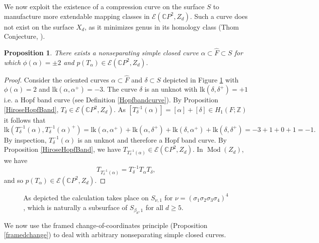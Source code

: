 \documentclass[10pt]{amsart}
\numberwithin{equation}{section}
\theoremstyle{plain}
\newtheorem{proposition}[theorem]{Proposition}
\theoremstyle{definition}
\theoremstyle{remark}
\DeclareMathOperator{\Mod}{Mod}
\begin{document}
We now exploit the existence of a compression curve on the surface $S$ to manufacture more extendable mapping classes in $\mathcal{E}(\mathbb{C}P^2,Z_d)$. Such a curve does not exist on the surface $X_d$,  as it minimizes genus in its homology class (Thom Conjecture, \cite{KronMrowka}). 



\begin{proposition} \label{existcurves}
There exists a nonseparating simple closed curve $\alpha \subset \widehat{F} \subset S$ for which $\phi(\alpha) = \pm2$ and $p(T_{\alpha})\in\mathcal{E}(\mathbb{C}P^2,Z_d)$. 
\end{proposition}

\begin{proof}
Consider the oriented curves $\alpha \subset \widehat{F}$ and $\delta \subset S$ depicted in Figure \ref{existenceofcurves} with $\phi(\alpha) = 2$ and $\mathrm{lk}(\alpha,\alpha^+) = -3$. The curve $\delta$ is an unknot with $\textrm{lk}(\delta,\delta^+) = +1$ i.e. a Hopf band curve (see Definition \ref{Hopfbandcurve}). By Proposition \ref{HiroseHopfBand}, $T_{\delta} \in \mathcal{E}(\mathbb{C}P^2,Z_d)$. %
As $[T_{\delta}^{-1}(\alpha)] = [\alpha] + [\delta] \in H_1(F;\mathbb{Z})$ it follows that \[\textrm{lk}(T_{\delta}^{-1}(\alpha),T_{\delta}^{-1}(\alpha)^+) = \mathrm{lk}(\alpha,\alpha^+) + \mathrm{lk}(\alpha,\delta^+) + \mathrm{lk}(\delta,\alpha^+) + \mathrm{lk}(\delta,\delta^+) = -3 + 1 + 0 + 1 =  -1.\] By inspection, $T_{\delta}^{-1}(\alpha)$ is an unknot and therefore a Hopf band curve. By Proposition \ref{HiroseHopfBand}, we have $T_{T_{\delta}^{-1}(\alpha)} \in \mathcal{E}(\mathbb{C}P^2,Z_d)$. In $\Mod(Z_d)$, we have \[T_{T_{\delta}^{-1}(\alpha)} = T_{\delta}^{-1}T_{\alpha}T_{\delta}, \] and so $p(T_{\alpha}) \in \mathcal{E}(\mathbb{C}P^2,Z_d)$. 
\end{proof}



\begin{figure}
  \centering
  \def\svgwidth{0.9\columnwidth}
  
  \caption{\textnormal{As depicted the calculation takes place on $S_{\nu,1}$ for $\nu= (\sigma_1\sigma_2\sigma_3\sigma_4)^4$, which is naturally a subsurface of $S_{\beta_d,1}$ for all $d \geq 5$.}}
  \label{existenceofcurves}
\end{figure}


We now use the  framed change-of-coordinates principle (Proposition \ref{framedchange}) to deal with arbitrary nonseparating simple closed curves. 
\end{document}
